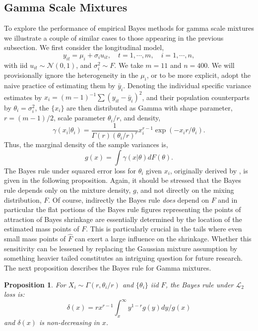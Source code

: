 \documentclass[12pt]{amsart}
\def\LL{\mathcal L}
\def\NN{\mathcal N}
\def\LL{\mathcal L}
\newtheorem{proposition}{Proposition}
\begin{document}
\subsection{Gamma Scale Mixtures}

To explore the performance of empirical Bayes methods for gamma scale mixtures
we illustrate a couple of similar cases to those appearing in the previous
subsection.  We first consider the longitudinal model, 
\[
y_{it} = \mu_i + \sigma_i u_{it}, \quad t = 1, \cdots, m, \quad i=1,\cdots , n,
\]
with iid $u_{it} \sim \NN (0,1)$, and
$\sigma_i^2 \sim F$.
We take
$m = 11$ and $n = 400$.  We will provisionally ignore the heterogeneity
in the $\mu_i$, or to be more explicit, adopt the naive practice of estimating
them by $\bar y_i$.  Denoting the individual specific variance estimates by
$x_i =  (m-1)^{-1} \sum (y_{it} - \bar y_i)^2$, and their population
counterparts by $\theta_i = \sigma_i^2$, the $\{x_i\}$ are then distributed
as Gamma with shape parameter, $r = (m-1)/2$, scale parameter $\theta_i /r$,
and density,
\[
\gamma( x_i | \theta_i ) = \frac{1}{\Gamma(r) (\theta_i /r)^r} x_i^{r-1} 
\exp( - x_i r / \theta_i ).
\]
Thus, the marginal density of the sample variances is,
\[
g(x) = \int \gamma (x | \theta ) dF(\theta).
\]
The Bayes rule under squared error loss for $\theta_i$ given $x_i$,
originally derived by , is given in the following 
proposition.  Again, it should be stressed that the Bayes rule depends only 
on the mixture density, $g$, and not directly on the mixing distribution, $F$.
Of course, indirectly the Bayes rule {\it does} depend on $F$ and in particular
the flat portions of the Bayes rule figures representing the points of attraction
of Bayes shrinkage are essentially determined by the location of the estimated mass
points of $F$.  This is particularly crucial in the tails where even small mass points
of $\hat F$ can exert a large influence on the shrinkage.  Whether this sensitivity
can be lessened by replacing the Gaussian mixture assumption by something heavier
tailed constitutes an intriguing question for future research.  The next proposition
describes the Bayes rule for Gamma mixtures.
\begin{proposition}
	For $X_i \sim \Gamma(r, \theta_i/r)$ and $\{ \theta_i \}$ iid $F$,
	the Bayes rule under $\LL_2$ loss is:
	\begin{equation}
		\delta(x) = r x^{r-1} \int_x^\infty y^{1-r} g(y) dy /g(x) 
	\label{eq.Tweediev}
	\end{equation}
	and $\delta (x)$ is non-decreasing in $x$.
\end{proposition}
\end{document}

